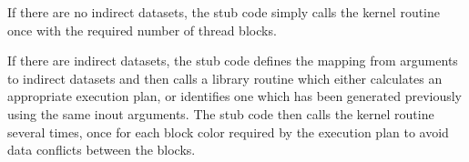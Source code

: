 \documentclass[12pt]{article}
\begin{document}
\begin{itemize}
If there are no indirect datasets, the stub code
simply calls the kernel routine once with the required
number of thread blocks.

If there are indirect datasets, the stub code defines
the mapping from arguments to indirect datasets and then
calls a library routine which either calculates an 
appropriate execution plan, or identifies one which has
been generated previously using the same inout arguments.
The stub code then calls the kernel routine several times,
once for each block color required by the execution plan
to avoid data conflicts between the blocks.



\end{itemize}
\end{document}
